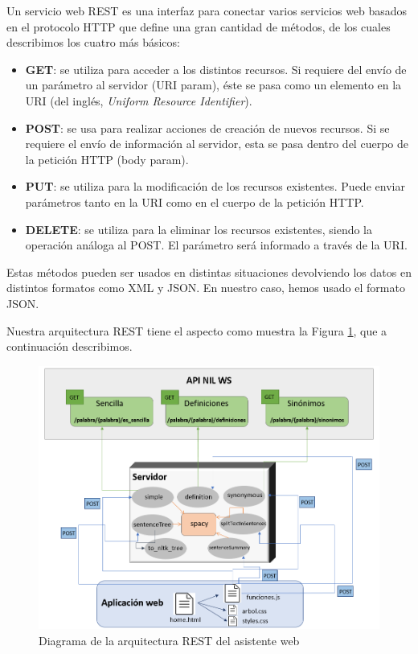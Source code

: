 Un servicio web REST es una interfaz para conectar varios servicios web basados en el protocolo HTTP que define una gran cantidad de métodos, de los cuales describimos los cuatro más básicos:
\begin{itemize}
	\item \textbf{GET}: se utiliza para acceder a los distintos recursos. Si requiere del envío de un parámetro al servidor (URI param), éste se pasa como un elemento en la URI (del inglés, \textit{Uniform Resource Identifier}). 
	
	\item \textbf{POST}: se usa para realizar acciones de creación de nuevos recursos. Si se requiere el envío de información al servidor, esta se pasa dentro del cuerpo de la petición HTTP (body param).
	
	\item \textbf{PUT}: se utiliza para la modificación de los recursos existentes. Puede enviar parámetros tanto en la URI como en el cuerpo de la petición HTTP.
	
	\item \textbf{DELETE}: se utiliza para la eliminar los recursos existentes, siendo la operación análoga al POST. El parámetro será informado a través de la URI.
\end{itemize}

Estas métodos pueden ser usados en distintas situaciones devolviendo los datos en distintos formatos como XML y JSON.
En nuestro caso, hemos usado el formato JSON.

Nuestra arquitectura REST tiene el aspecto como muestra la Figura \ref{fig:ArquitecturaAsistenteR}, que a continuación describimos.
\begin{figure}[h!]
	\centering
	
	
	\includegraphics[scale=0.9]{Imagenes/Figuras/ArquitecturaAsistenteR}
	
	
	\caption{Diagrama de la arquitectura REST del asistente web}
	\label{fig:ArquitecturaAsistenteR}
\end{figure}

